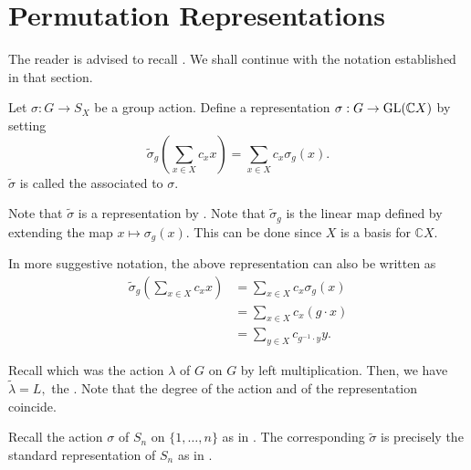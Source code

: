 \section{Permutation Representations} \label{sec:04}

The reader is advised to recall . We shall continue with the notation established in that section.

\begin{defn}%
	\label{defn:permrep}
	Let $\sigma : G \to S_X$ be a group action. Define a representation $\sigma : G \to \operatorname{GL}(\mathbb{C}X)$ by setting
	\begin{equation*} 
		\widetilde{\sigma}_g\left(\sum_{x \in X} c_x x\right) = \sum_{x \in X} c_x \sigma_g(x).
	\end{equation*}
	$\widetilde{\sigma}$ is called the  associated to $\sigma.$
\end{defn}

\begin{rem}
	Note that $\widetilde{\sigma}$ is a representation by . Note that $\widetilde{\sigma}_g$ is the linear map defined by extending the map $x \mapsto \sigma_g(x).$ This can be done since $X$ is a basis for $\mathbb{C}X.$

	In more suggestive notation, the above representation can also be written as
	\begin{align*} 
		\widetilde{\sigma}_g\left(\sum_{x \in X} c_x x\right) &= \sum_{x \in X} c_x \sigma_g(x)\\
		&= \sum_{x \in X} c_x(g \cdot x)\\
		&= \sum_{y \in X} c_{g^{-1} \cdot y} y.
	\end{align*}
\end{rem}

\begin{rem}
	Recall  which was the action $\lambda$ of $G$ on $G$ by left multiplication. Then, we have $\widetilde{\lambda} = L,$ the .	Note that the degree of the action and of the representation coincide.
\end{rem}

\begin{rem} \label{rem:stdrepSnispermrepofstdact}
	Recall the action $\sigma$ of $S_n$ on $\{1, \ldots, n\}$ as in . The corresponding $\widetilde{\sigma}$ is precisely the standard representation of $S_n$ as in .
\end{rem}

